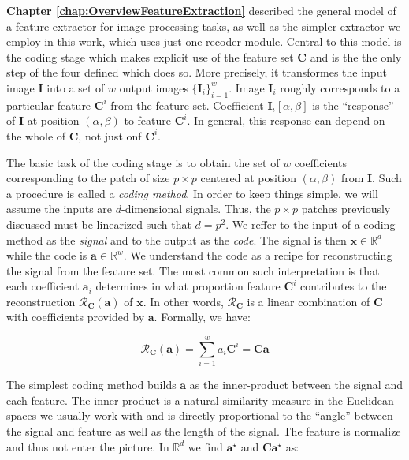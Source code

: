 \documentclass[12pt,a4paper,oneside,english]{UPBThesis}
\newcommand{\hctimes}[2]{{#1}\!\times\!{#2}}
\newcommand{\hcsignalspace}{\mathbb{R}^d}
\newcommand{\hcweightspace}{\mathbb{R}^w}
\begin{document}
\textbf{Chapter \ref{chap:OverviewFeatureExtraction}} described the general model of a feature extractor for image processing tasks, as well as the simpler extractor we employ in this work, which uses just one recoder module. Central to this model is the coding stage which makes explicit use of the feature set \textbf{C} and is the the only step of the four defined which does so. More precisely, it transformes the input image $\textbf{I}$ into a set of $w$ output images $\{\textbf{I}_i\}_{i=1}^w$. Image $\textbf{I}_i$ roughly corresponds to a particular feature $\textbf{C}^i$ from the feature set. Coefficient $\textbf{I}_i[\alpha,\beta]$ is the ``response'' of $\textbf{I}$ at position $(\alpha,\beta)$ to feature $\textbf{C}^i$. In general, this response can depend on the whole of $\textbf{C}$, not just onf $\textbf{C}^i$.

The basic task of the coding stage is to obtain the set of $w$ coefficients corresponding to the patch of size $\hctimes{p}{p}$ centered at position $(\alpha,\beta)$ from $\textbf{I}$. Such a procedure is called a \emph{coding method}. In order to keep things simple, we will assume the inputs are $d$-dimensional signals. Thus, the $\hctimes{p}{p}$ patches previously discussed must be linearized such that $d = p^2$. We reffer to the input of a coding method as the \emph{signal} and to the output as the \emph{code}. The signal is then $\textbf{x} \in \hcsignalspace$ while the code is $\textbf{a} \in \hcweightspace$. We understand the code as a recipe for reconstructing the signal from the feature set. The most common such interpretation is that each coefficient $\textbf{a}_i$ determines in what proportion feature $\textbf{C}^i$ contributes to the reconstruction $\mathcal{R}_\textbf{C}(\textbf{a})$ of $\textbf{x}$. In other words, $\mathcal{R}_\textbf{C}$ is a linear combination of $\textbf{C}$ with coefficients provided by $\textbf{a}$. Formally, we have:

\begin{equation*}
\mathcal{R}_\textbf{C}(\textbf{a}) = \sum_{i=1}^{w}{a_i \textbf{C}^i} = \textbf{C}\textbf{a}
\end{equation*}

The simplest coding method builds $\textbf{a}$ as the inner-product between the signal and each feature. The inner-product is a natural similarity measure in the Euclidean spaces we usually work with and is directly proportional to the ``angle'' between the signal and feature as well as the length of the signal. The feature is normalize and thus not enter the picture. In $\hcsignalspace$ we find $\textbf{a}^\star$ and $\textbf{C}\textbf{a}^\star$ as:
\end{document}

